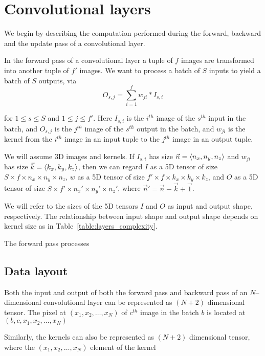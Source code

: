 \section{Convolutional layers}

  We begin by describing the computation performed during the forward,
  backward and the update pass of a convolutional layer.

  In the forward pass of a convolutional layer a tuple of $f$ images
  are transformed into another tuple of $f'$ images.  We want to
  process a batch of $S$ inputs to yield a batch of $S$ outputs, via
  \[
  O_{s,j} = \sum_{i=1}^f w_{ji}\ast I_{s,i}
  \]

  for $1 \le s \le S$ and $1 \le j \le f'$.  Here $I_{s,i}$ is the
  $i^{th}$ image of the $s^{th}$ input in the batch, and $O_{s,j}$ is
  the $j^{th}$ image of the $s^{th}$ output in the batch, and $w_{ji}$
  is the kernel from the $i^{th}$ image in an input tuple to the
  $j^{th}$ image in an output tuple.

  We will assume 3D images and kernels.  If $I_{s,i}$ has size
  $\vec{n} = \langle n_x, n_y, n_z\rangle$ and $w_{ji}$ has size $\vec{k} =
  \langle k_x,k_y,k_z\rangle$, then we can regard $I$ as a 5D tensor of size
  $S \times f \times n_x \times n_y \times n_z$, $w$ as a 5D tensor of
  size $f' \times f \times k_x \times k_y \times k_z$, and $O$ as a 5D
  tensor of size $S \times f' \times n_x' \times n_y' \times n_z'$,
  where $\vec{n}' = \vec{n} - \vec{k} + \vec{1}$.

  We will refer to the sizes of the 5D tensors $I$ and $O$ as input
  and output shape, respectively.  The relationship between input
  shape and output shape depends on kernel size as in
  Table~\ref{table:layers_complexity}.



  The forward pass processes

\subsection{Data layout}

  Both the input and output of both the forward pass and backward pass
  of an $N$--dimensional convolutional layer can be represented as
  $(N+2)$ dimensional tensor.  The pixel at $(x_1,x_2,\dots,x_N)$ of
  $c^{th}$ image in the batch $b$ is located at
  $(b,c,x_1,x_2,\dots,x_N)$

  Similarly, the kernels can also be represented as $(N+2)$
  dimensional tensor, where the $(x_1,x_2,\dots,x_N)$ element of the kernel

